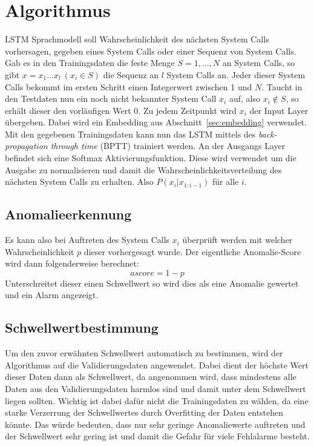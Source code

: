 \section{Algorithmus}\label{sec:Algorithmus}
    LSTM Sprachmodell soll Wahrscheinlichkeit des nächsten System Calls vorhersagen, gegeben eines System Calls oder einer Sequenz von System Calls.
    Gab es in den Trainingsdaten die feste Menge $S = {1,\dots,N}$ an System Calls, so gibt $x=x_1\dots x_l \ (x_i\in S)$ die Sequenz an $l$ System Calls an.
    Jeder dieser System Calls bekommt im ersten Schritt einen Integerwert zwischen 1 und $N$.
    Taucht in den Testdaten nun ein noch nicht bekannter System Call $x_i$ auf, also $x_i \notin S$, so erhält dieser den vorläufigen Wert 0.
    Zu jedem Zeitpunkt wird $x_i$ der Input Layer übergeben.
    Dabei wird ein Embedding aus Abschnitt~\ref{sec:embedding} verwendet. 
    Mit den gegebenen Trainingsdaten kann nun das LSTM mittels des \textit{back-propagation through time} (BPTT) trainiert werden.
    An der Ausgangs Layer befindet sich eine Softmax Aktivierungsfunktion.
    Diese wird verwendet um die Ausgabe zu normalisieren und damit die Wahrscheinlichkeitsverteilung des nächsten System Calls zu erhalten.
    Also $P\left(x_i|x_{1:i-1}\right)$ für alle $i$. 
    
    \subsection{Anomalieerkennung}
        Es kann also bei Auftreten des System Calls $x_i$ überprüft werden mit welcher Wahrscheinlichkeit $p$ dieser vorhergesagt wurde.
        Der eigentliche Anomalie-Score wird dann folgenderweise berechnet:
        \begin{equation}
            ascore = 1 - p
        \end{equation}
        Unterschreitet dieser einen Schwellwert so wird dies als eine Anomalie gewertet und ein Alarm angezeigt.
        \subsection{Schwellwertbestimmung}
        Um den zuvor erwähnten Schwellwert automatisch zu bestimmen, wird der Algorithmus auf die Validierungsdaten angewendet. 
        Dabei dient der höchste Wert dieser Daten dann als Schwellwert, da angenommen wird, dass mindestens alle Daten aus den Validierungsdaten harmlos sind und damit unter dem Schwellwert liegen sollten.
        Wichtig ist dabei dafür nicht die Trainingsdaten zu wählen, da eine starke Verzerrung der Schwellwertes durch Overfitting der Daten entstehen könnte. 
        Das würde bedeuten, dass nur sehr geringe Anomaliewerte auftreten und der Schwellwert sehr gering ist und damit die Gefahr für viele Fehlalarme besteht.

